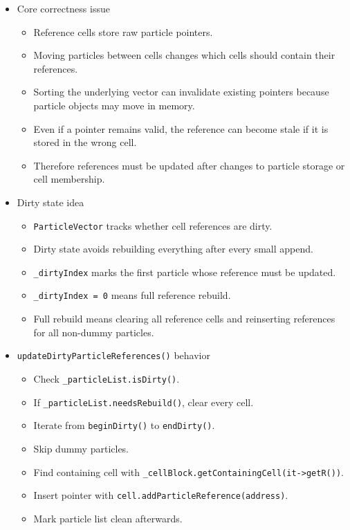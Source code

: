 \begin{itemize}
    \item Core correctness issue
    \begin{itemize}
        \item Reference cells store raw particle pointers.
        \item Moving particles between cells changes which cells should contain their references.
        \item Sorting the underlying vector can invalidate existing pointers because particle objects may move in memory.
        \item Even if a pointer remains valid, the reference can become stale if it is stored in the wrong cell.
        \item Therefore references must be updated after changes to particle storage or cell membership.
    \end{itemize}

    \item Dirty state idea
    \begin{itemize}
        \item \texttt{ParticleVector} tracks whether cell references are dirty.
        \item Dirty state avoids rebuilding everything after every small append.
        \item \texttt{\_dirtyIndex} marks the first particle whose reference must be updated.
        \item \texttt{\_dirtyIndex = 0} means full reference rebuild.
        \item Full rebuild means clearing all reference cells and reinserting references for all non-dummy particles.
    \end{itemize}

    \item \texttt{updateDirtyParticleReferences()} behavior
    \begin{itemize}
        \item Check \texttt{\_particleList.isDirty()}.
        \item If \texttt{\_particleList.needsRebuild()}, clear every cell.
        \item Iterate from \texttt{beginDirty()} to \texttt{endDirty()}.
        \item Skip dummy particles.
        \item Find containing cell with \texttt{\_cellBlock.getContainingCell(it->getR())}.
        \item Insert pointer with \texttt{cell.addParticleReference(address)}.
        \item Mark particle list clean afterwards.
    \end{itemize}


\end{itemize}
